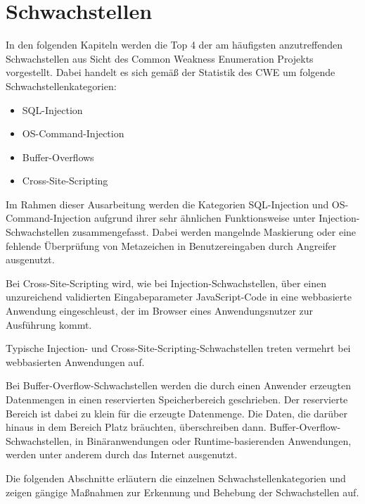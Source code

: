 \fancyhead[L]{} %
\section{Schwachstellen}

In den folgenden Kapiteln werden die Top 4 der am häufigsten anzutreffenden Schwachstellen aus Sicht des Common Weakness Enumeration \cite{christey_2011} Projekts vorgestellt. Dabei handelt es sich gemäß der Statistik des CWE um folgende Schwachstellenkategorien:

\begin{itemize}
  \item SQL-Injection
  \item OS-Command-Injection
  \item Buffer-Overflows
  \item Cross-Site-Scripting
\end{itemize}

Im Rahmen dieser Ausarbeitung werden die Kategorien SQL-Injection und 
OS-Command-Injection aufgrund ihrer sehr ähnlichen Funktionsweise 
unter Injection-\\Schwachstellen zusammengefasst.
Dabei werden mangelnde Maskierung oder eine fehlende Überprüfung von Metazeichen 
in Benutzereingaben durch Angreifer ausgenutzt.

Bei Cross-Site-Scripting wird, wie bei Injection-Schwachstellen, 
über einen unzureichend validierten Eingabeparameter JavaScript-Code in 
eine webbasierte Anwendung eingeschleust, der im Browser eines 
Anwendungsnutzer zur Ausführung kommt.

Typische Injection- und Cross-Site-Scripting-Schwachstellen treten 
vermehrt bei webbasierten Anwendungen auf.

Bei Buffer-Overflow-Schwachstellen werden die durch einen Anwender erzeugten
Datenmengen in einen reservierten Speicherbereich geschrieben. 
Der reservierte Bereich ist dabei zu klein für die erzeugte Datenmenge.
Die Daten, die darüber hinaus in dem Bereich Platz bräuchten, überschreiben 
dann.  
Buffer-Overflow-Schwachstellen, in Binäranwendungen oder 
Runtime-basierenden Anwendungen, werden unter anderem durch das Internet 
ausgenutzt.

Die folgenden Abschnitte erläutern die einzelnen Schwachstellenkategorien 
und zeigen gängige Maßnahmen zur Erkennung und Behebung der Schwachstellen auf.

\newpage
\fancyhead[L]{\nouppercase{\leftmark}} %


